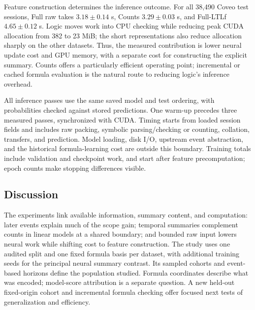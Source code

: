 \documentclass[sigconf,anonymous,nonacm]{acmart}
\newif\ifrevisions
\newenvironment{revblock}{\begingroup\ifrevisions\color{red}\fi}{\endgroup}
\begin{document}
\begin{revblock}
Feature construction determines the inference outcome. For all 38,490 Coveo test sessions, Full raw takes $3.18\pm0.14$ s, Counts $3.29\pm0.03$ s, and Full-LTLf $4.65\pm0.12$ s. Logic moves work into CPU checking while reducing peak CUDA allocation from 382 to 23 MiB; the short representations also reduce allocation sharply on the other datasets. Thus, the measured contribution is lower neural update cost and GPU memory, with a separate cost for constructing the explicit summary. Counts offers a particularly efficient operating point; incremental or cached formula evaluation is the natural route to reducing logic's inference overhead.

All inference passes use the same saved model and test ordering, with probabilities checked against stored predictions. One warm-up precedes three measured passes, synchronized with CUDA. Timing starts from loaded session fields and includes raw packing, symbolic parsing/checking or counting, collation, transfers, and prediction. Model loading, disk I/O, upstream event abstraction, and the historical formula-learning cost are outside this boundary. Training totals include validation and checkpoint work, and start after feature precomputation; epoch counts make stopping differences visible.

\subsection{Discussion}
\label{sec:discussion}
The experiments link available information, summary content, and computation: later events explain much of the scope gain; temporal summaries complement counts in linear models at a shared boundary; and bounded raw input lowers neural work while shifting cost to feature construction. The study uses one audited split and one fixed formula basis per dataset, with additional training seeds for the principal neural summary contrast. Its sampled cohorts and event-based horizons define the population studied. Formula coordinates describe what was encoded; model-score attribution is a separate question. A new held-out fixed-origin cohort and incremental formula checking offer focused next tests of generalization and efficiency.


\end{revblock}
\end{document}
